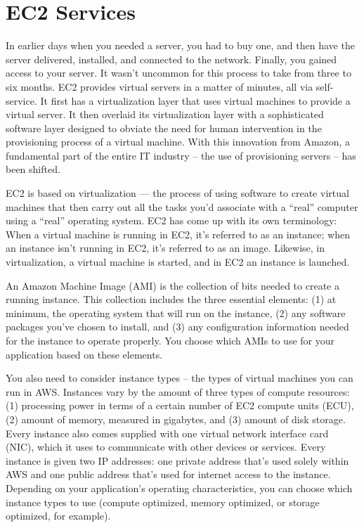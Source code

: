 \documentclass[]{book}
\begin{document}
\hypertarget{ec2-services}{%
\section{EC2 Services}\label{ec2-services}}

In earlier days when you needed a server, you had to buy one, and then have the server delivered, installed, and connected to the network. Finally, you gained access to your server. It wasn't uncommon for this process to take from three to six months. EC2 provides virtual servers in a matter of minutes, all via self-service. It first has a virtualization layer that uses virtual machines to provide a virtual server. It then overlaid its virtualization layer with a sophisticated software layer designed to obviate the need for human intervention in the provisioning process of a virtual machine. With this innovation from Amazon, a fundamental part of the entire IT industry -- the use of provisioning servers -- has been shifted.

EC2 is based on virtualization --- the process of using software to create virtual machines that then carry out all the tasks you'd associate with a ``real'' computer using a ``real'' operating system. EC2 has come up with its own terminology: When a virtual machine is running in EC2, it's referred to as an instance; when an instance isn't running in EC2, it's referred to as an image. Likewise, in virtualization, a virtual machine is started, and in EC2 an instance is launched.

An Amazon Machine Image (AMI) is the collection of bits needed to create a running instance. This collection includes the three essential elements: (1) at minimum, the operating system that will run on the instance, (2) any software packages you've chosen to install, and (3) any configuration information needed for the instance to operate properly. You choose which AMIs to use for your application based on these elements.

You also need to consider instance types -- the types of virtual machines you can run in AWS. Instances vary by the amount of three types of compute resources: (1) processing power in terms of a certain number of EC2 compute units (ECU), (2) amount of memory, measured in gigabytes, and (3) amount of disk storage. Every instance also comes supplied with one virtual network interface card (NIC), which it uses to communicate with other devices or services. Every instance is given two IP addresses: one private address that's used solely within AWS and one public address that's used for internet access to the instance. Depending on your application's operating characteristics, you can choose which instance types to use (compute optimized, memory optimized, or storage optimized, for example).
\end{document}
